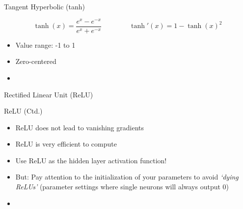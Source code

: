 \begin{frame}{Tangent Hyperbolic (tanh)}{}
	\begin{boxBlueNoFrame}
		\begin{equation*}
			\tanh(x) = \frac{e^x - e^{-x}}{e^x + e^{-x}} \qquad\qquad
			\tanh'(x) = 1 - \tanh(x)^2
		\end{equation*}
	\end{boxBlueNoFrame}
	
	\begin{itemize}
		\item Value range: -1 to 1
		\item Zero-centered
		\item {}
	\end{itemize}
\end{frame}


\begin{frame}{Rectified Linear Unit (ReLU)}{}\important
\end{frame}


\begin{frame}{ReLU (Ctd.)}{}\important
	\begin{itemize}
		\item ReLU does not lead to vanishing gradients
		\item ReLU is very efficient to compute
		\item Use ReLU as the hidden layer activation function!
		\item But: Pay attention to the initialization of your parameters to avoid \textit{`dying ReLUs'} (parameter settings where single neurons will always output 0)
		\item {}
	\end{itemize}
\end{frame}


